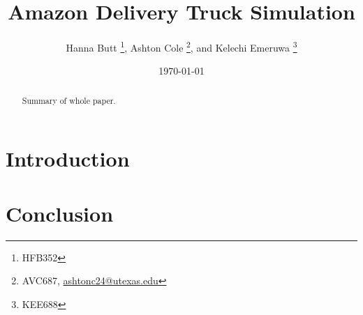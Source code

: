 \documentclass[letterpaper]{article}
\title{Amazon Delivery Truck Simulation}
\author{Hanna Butt \thanks{HFB352}, Ashton Cole \thanks{AVC687, \href{mailto:ashtonc24@utexas.edu}{ashtonc24@utexas.edu}}, and Kelechi Emeruwa \thanks{KEE688}}
\date{\today}
\begin{document}
    \maketitle
    \begin{abstract}
        Summary of whole paper.
    \end{abstract}
    \section{Introduction}
    \section{Conclusion}
\end{document}
